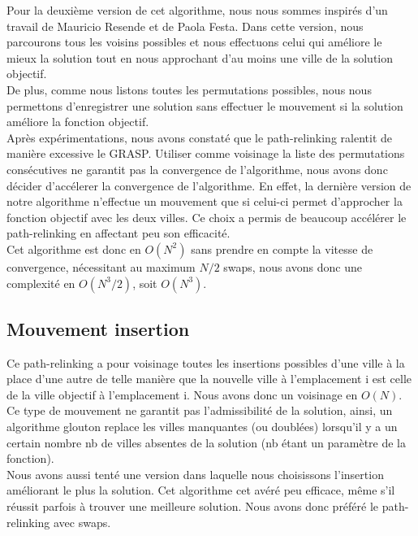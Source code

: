 \documentclass[12pt,a4paper]{article}
\begin{document}
Pour la deuxième version de cet algorithme, nous nous sommes inspirés d'un travail de Mauricio Resende et de Paola Festa. Dans cette version, nous parcourons tous les voisins possibles et nous effectuons celui qui améliore le mieux la solution tout en nous approchant d'au moins une ville de la solution objectif.\\

De plus, comme nous listons toutes les permutations possibles, nous nous permettons d'enregistrer une solution sans effectuer le mouvement si la solution améliore la fonction objectif.\\

Après expérimentations, nous avons constaté que le path-relinking ralentit de manière excessive le GRASP. Utiliser comme voisinage la liste des permutations consécutives ne garantit pas la convergence de l'algorithme, nous avons donc décider d'accélerer la convergence de l'algorithme. En effet, la dernière version de notre algorithme n'effectue un mouvement que si celui-ci permet d'approcher la fonction objectif avec les deux villes. Ce choix a permis de beaucoup accélérer le path-relinking en affectant peu son efficacité.\\

Cet algorithme est donc en $O(N^2)$ sans prendre en compte la vitesse de convergence, nécessitant au maximum $N/2$ swaps, nous avons donc une complexité en $O(N^3/2)$, soit $O(N^3)$.\\

\subsection{Mouvement insertion}

Ce path-relinking a pour voisinage toutes les insertions possibles d'une ville à la place d'une autre de telle manière que la nouvelle ville à l'emplacement i est celle de la ville objectif à l'emplacement i. Nous avons donc un voisinage en $O(N)$. Ce type de mouvement ne garantit pas l'admissibilité de la solution, ainsi, un algorithme glouton replace les villes manquantes (ou doublées) lorsqu'il y a un certain nombre nb de villes absentes de la solution (nb étant un paramètre de la fonction).\\

Nous avons aussi tenté une version dans laquelle nous choisissons l'insertion améliorant le plus la solution. Cet algorithme cet avéré peu efficace, même s'il réussit parfois à trouver une meilleure solution. Nous avons donc préféré le path-relinking avec swaps.\\
\end{document}
